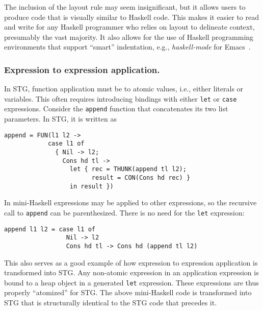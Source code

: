 \documentclass{llncs}
\begin{document}
The inclusion of the layout rule may seem insignificant, but it
allows users to produce code that is visually similar to Haskell code.
This makes it easier to read and write for any Haskell programmer who relies
on layout to delineate context, presumably the vast majority.  It also allows
for the use of Haskell programming environments that support ``smart''
indentation, e.g., \emph{haskell-mode} for Emacs~\cite{haskellmode}.





\subsubsection{Expression to expression application.}

In STG, function application must be to atomic values, i.e., either literals or
variables.  This often requires introducing bindings with either \texttt{let} or
\texttt{case} expressions.  Consider the \texttt{append} function that
concatenates its two list parameters.  In STG, it is written as

{\footnotesize
\begin{verbatim}
append = FUN(l1 l2 ->
            case l1 of
              { Nil -> l2;
                Cons hd tl -> 
                  let { rec = THUNK(append tl l2);
                        result = CON(Cons hd rec) }
                  in result })
\end{verbatim}}
In mini-Haskell expressions may be applied to other expressions, so the
recursive call to \texttt{append} can be parenthesized. There is no need for the
\texttt{let} expression:
{\footnotesize
\begin{verbatim}
append l1 l2 = case l1 of
                 Nil -> l2
                 Cons hd tl -> Cons hd (append tl l2)
\end{verbatim}}
This also serves as a good example of how expression to expression application is
transformed into STG.  Any non-atomic expression in an application expression is
bound to a heap object in a generated \texttt{let} expression.  These
expressions are thus properly ``atomized'' for STG.  The above mini-Haskell code
is transformed into STG that is structurally identical to the STG code that
precedes it.
\end{document}
